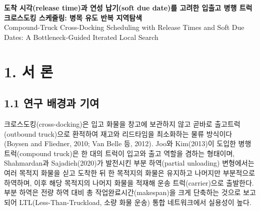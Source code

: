 \documentclass[10pt,a4paper]{article}
\begin{document}
\begin{center}
{\Large\bfseries 도착 시각(release time)과 연성 납기(soft due date)를 고려한 입출고 병행 트럭 크로스도킹 스케줄링: 병목 유도 반복 지역탐색}\\[2mm]
{\large Compound-Truck Cross-Docking Scheduling with Release Times and Soft Due Dates: A Bottleneck-Guided Iterated Local Search}
\end{center}


\begin{abstract}
\noindent This study schedules compound trucks in a multi-door cross-dock with truck-specific release times and soft due dates. A compound truck partially unloads, keeps the freight of one destination, and then carries it out, so a late arrival can delay other carriers waiting for transferred freight. We formulate mixed-integer linear programming and constraint programming-satisfiability (CP-SAT) models that minimize makespan and total tardiness, and propose a Vogel Approximation Algorithm--based Guided Iterated Local Search (VAA-GILS) with bottleneck-guided operators, best-improvement descent, and kick restarts. On small instances and unconstrained medium instances, VAA-GILS averages 0.11--0.23\% above CP-SAT references in under 0.5 s, and 0.23\% above the proven optima of 20 small instances. It outperforms benchmark heuristics under equal runtime and solves large instances within seconds, where CP-SAT returns no feasible solution within 600 s.

\smallskip
\noindent\textbf{Keywords:} Cross-Docking, Compound Truck, Release Time, Soft Due Date, Iterated Local Search, Constraint Programming
\end{abstract}

\section{1. 서 론}
\subsection{1.1 연구 배경과 기여}

크로스도킹(cross-docking)은 입고 화물을 창고에 보관하지 않고 곧바로 출고트럭(outbound truck)으로 환적하여
재고와 리드타임을 최소화하는 물류 방식이다(Boysen and Fliedner, 2010; Van Belle 등, 2012). Joo와
Kim(2013)이 도입한 병행 트럭(compound truck)은 한 대의 트럭이 입고와 출고 역할을 겸하는 형태이며,
Shahmardan과 Sajadieh(2020)가 발전시킨 부분 하역(partial unloading) 변형에서는 여러 목적지
화물을 싣고 도착한 뒤 한 목적지의 화물은 유지하고 나머지만 부분적으로 하역하며,
이후 해당 목적지의 나머지 화물을 적재해 운송 트럭(carrier)으로 출발한다. 부분 하역은 전량 하역 대비 총 작업완료시간(makespan)을 크게 단축하는 것으로 보고되어 LTL(Less-Than-Truckload, 소량 화물 운송) 통합 네트워크에서 실용성이 높다.
\end{document}
